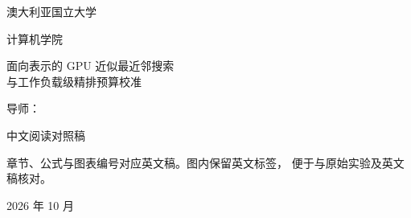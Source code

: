 \begin{titlepage}
\centering
{}
\vspace*{10mm}
{\large 澳大利亚国立大学\par}
\vspace{3mm}
{\normalsize 计算机学院\par}
\vspace{32mm}
{\fontsize{32}{38}\selectfont\bfseries\thesisshorttitle\par}
\vspace{8mm}
{\fontsize{18}{26}\selectfont 面向表示的 GPU 近似最近邻搜索\\
与工作负载级精排预算校准\par}
\vspace{24mm}
{\Large\thesisauthor\par}
\vspace{8mm}
{\normalsize 导师：\thesissupervisor\par}
\vfill
{中文阅读对照稿\par}
\vspace{5mm}
\begin{minipage}{0.82\linewidth}
\small\centering
章节、公式与图表编号对应英文稿。图内保留英文标签，
便于与原始实验及英文稿核对。
\end{minipage}\par
\vspace{8mm}
{\thesiscourse\par}
\vspace{12mm}
{2026 年 10 月\par}
\vspace*{6mm}
\end{titlepage}
